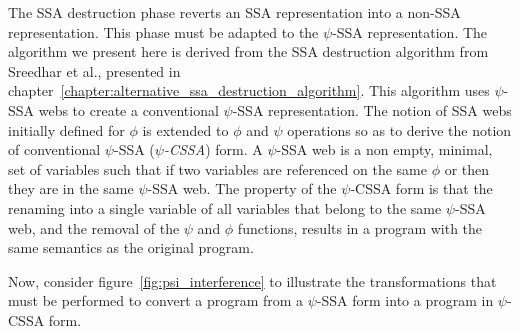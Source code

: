 The SSA destruction phase reverts an SSA representation into a non-SSA
representation. This phase must be adapted to the $\psi$-SSA
representation. The algorithm we present here is derived from the SSA
destruction algorithm from Sreedhar et al., presented in
chapter~\ref{chapter:alternative_ssa_destruction_algorithm}. This algorithm uses
$\psi$-SSA webs to create a conventional $\psi$-SSA
representation. The notion of SSA webs initially defined for $\phi$ is
extended to $\phi$ and $\psi$ operations so as to derive the notion of
conventional $\psi$-SSA ({\em $\psi$-CSSA}) form. A $\psi$-SSA web is
a non empty, minimal, set of variables such that if two variables are
referenced on the same $\phi$ or \psifun then they are in the
same $\psi$-SSA web. The property of the $\psi$-CSSA form is that the
renaming into a single variable of all variables that belong to the
same $\psi$-SSA web, and the removal of the $\psi$ and $\phi$
functions, results in a program with the same semantics as the
original program.


Now, consider figure~\ref{fig:psi_interference} to illustrate the
transformations that must be performed to convert a program from a
$\psi$-SSA form into a program in $\psi$-CSSA form.

